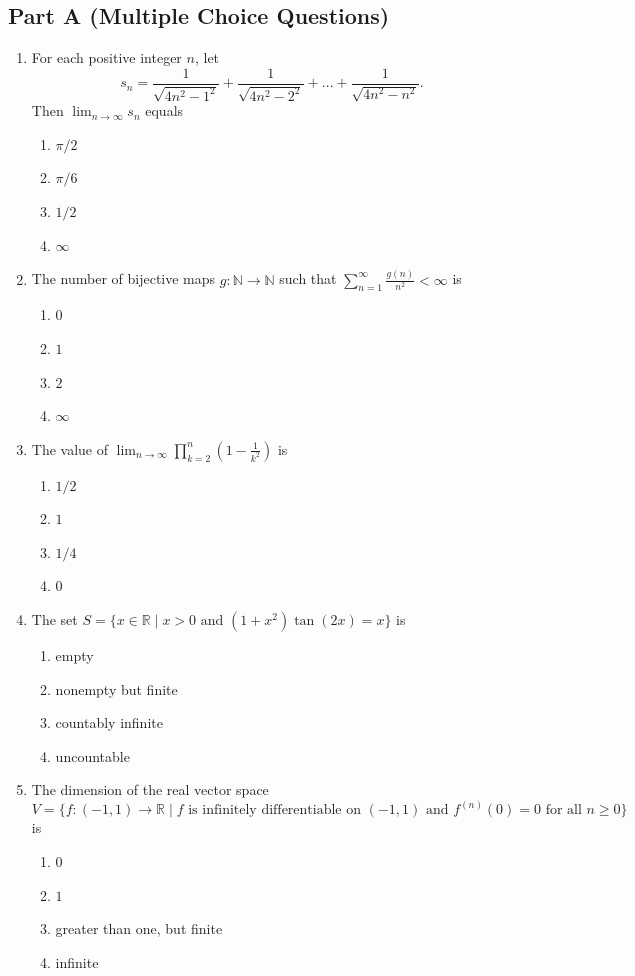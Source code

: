 \documentclass[11pt, a4paper]{article}
\begin{document}
\subsection*{Part A (Multiple Choice Questions)}
\begin{enumerate}
  \item For each positive integer $n$, let
  \[
    s_n = \frac{1}{\sqrt{4n^2 - 1^2}} + \frac{1}{\sqrt{4n^2 - 2^2}} + \dots + \frac{1}{\sqrt{4n^2 - n^2}}.
  \]
  Then $\lim_{n \to \infty} s_n$ equals
  \begin{enumerate}[label=(\alph*)]
    \item $\pi/2$
    \item $\pi/6$
    \item $1/2$
    \item $\infty$
  \end{enumerate}

  \item The number of bijective maps $g: \mathbb{N} \to \mathbb{N}$ such that $\sum_{n=1}^\infty \frac{g(n)}{n^2} < \infty$ is
  \begin{enumerate}[label=(\alph*)]
    \item $0$
    \item $1$
    \item $2$
    \item $\infty$
  \end{enumerate}

  \item The value of $\displaystyle \lim_{n \to \infty} \prod_{k=2}^n \left(1 - \frac{1}{k^2}\right)$ is
  \begin{enumerate}[label=(\alph*)]
    \item $1/2$
    \item $1$
    \item $1/4$
    \item $0$
  \end{enumerate}

  \item The set $S = \{x \in \mathbb{R} \mid x > 0 \text{ and } (1 + x^2)\tan(2x) = x\}$ is
  \begin{enumerate}[label=(\alph*)]
    \item empty
    \item nonempty but finite
    \item countably infinite
    \item uncountable
  \end{enumerate}

  \item The dimension of the real vector space
  \[
    V = \{f: (-1, 1) \to \mathbb{R} \mid f \text{ is infinitely differentiable on } (-1, 1) \text{ and } f^{(n)}(0) = 0 \text{ for all } n \ge 0\}
  \]
  is
  \begin{enumerate}[label=(\alph*)]
    \item $0$
    \item $1$
    \item greater than one, but finite
    \item infinite
  \end{enumerate}


\end{enumerate}
\end{document}
